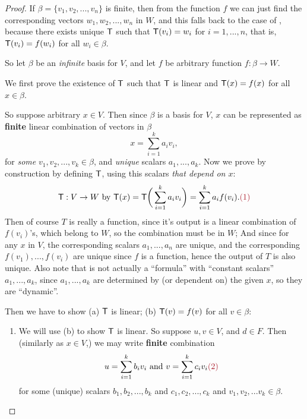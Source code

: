 \begin{proof}
If \(\beta = \{ v_1, v_2, ..., v_n \}\) is finite, then from the function \(f\) we can just find the corresponding vectors \(w_1, w_2, ..., w_n\) in \(W\),
and this falls back to the case of , because there exists unique \LTRAN{} \(\textsf{T}\) such that \(\textsf{T}(v_i) = w_i\) for \(i = 1, ..., n\),
that is, \(\textsf{T}(v_i) = f(w_i)\) for all \(w_i \in \beta\).

So let \(\beta\) be an \emph{infinite} basis for \(V\), and let \(f\) be arbitrary function \(f: \beta \to W\).

We first prove the existence of \(\textsf{T}\) such that \(\textsf{T}\) is linear and \(\textsf{T}(x) = f(x)\) for all \(x \in \beta\).

So suppose arbitrary \(x \in V\).
Then since \(\beta\) is a basis for \(V\), \(x\) can be represented as \textbf{finite} linear combination of vectors in \(\beta\)
\[
    x = \sum_{i = 1}^k a_i v_i,
\]
for \emph{some} \(v_1, v_2, ..., v_k \in \beta\), and \emph{unique} scalars \(a_1, ..., a_k\).
Now we prove by construction by defining \(\textsf{T}\), using this scalars \emph{that depend on \(x\)}:
\[
    \T : V \to W \text{ by } \T(x) = \T\bigg(\sum_{i = 1}^k a_i v_i\bigg) = \sum_{i = 1}^k a_i f(v_i). \MAROON{(1)}
\]
Then of course \(T\) is really a function, since
 it's output is a linear combination of \(f(v_i)\)'s, which belong to \(W\), so the combination must be in \(W\);
 And since for any \(x\) in \(V\), the corresponding scalars \(a_1, ..., a_n\) are unique, and the corresponding \(f(v_1), ..., f(v_i)\) are unique since \(f\) is a function, hence the output of \(T\) is also unique.
Also note that  is not actually a ``formula'' with ``constant scalars'' \(a_1, ..., a_k\), since \(a_1, ..., a_k\) are determined by (or dependent on) the given \(x\), so they are ``dynamic''.

Then we have to show (a) \(\textsf{T}\) is linear; (b) \(\textsf{T}(v) = f(v)\) for all \(v \in \beta\):
\begin{enumerate}
\item
We will use (b) to show \(\textsf{T}\) is linear.
So suppose \(u, v \in V\), and \(d \in F\).
Then (similarly as \(x \in V\),) we may write \textbf{finite} combination
\[
    u = \sum_{i = 1}^{k} b_i v_i \text{ and } v = \sum_{i = 1}^{k} c_i v_i \MAROON{(2)}
\]
for some (unique) scalars \(b_1, b_2, ..., b_k\) and \(c_1, c_2, ..., c_k\) and \(v_1, v_2, ... v_k \in \beta\).


\end{enumerate}
\end{proof}
